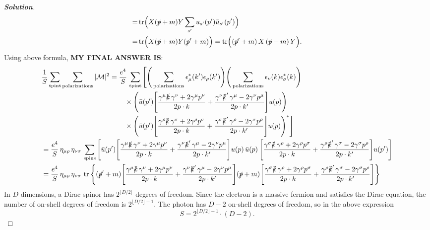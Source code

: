 \documentclass[11pt]{article}
\newenvironment{solution}[1][]{\begin{proof}[\textbf{Solution}]}{\end{proof}}
\begin{document}
\begin{solution}[14.6]
\[\begin{aligned}
	=&\operatorname{tr}\!\Big(X(\slashed p+m)Y\sum_{s'}u_{s'}(p')\bar u_{s'}(p')\Big)\\
	=&\operatorname{tr}\!\Big(X(\slashed p+m)Y(\slashed p'+m)\Big)=\operatorname{tr}\!\Big((\slashed p'+m)\,X\,(\slashed p+m)\,Y\Big).
\end{aligned}
\]
Using above formula, \textbf{MY FINAL ANSWER IS}:
\[
\begin{aligned}
	&\frac1S\sum_{\text{spins}}\sum_{\text{polarizations}}|\mathcal M|^2
	=\frac{e^4}{S}\,
	\sum_{\text{spins}}
	\Bigg[
	\Bigg(\sum_{\text{polarizations}}\epsilon_\mu^*(k')\epsilon_\rho(k')\Bigg)
	\Bigg(\sum_{\text{polarizations}}\epsilon_\nu(k)\epsilon_\sigma^*(k)\Bigg)
	\\
	&\qquad\qquad\qquad\qquad\qquad\qquad\times
	\Bigg(\bar u(p')\Bigg[
	\frac{\gamma^\mu\slashed k\,\gamma^\nu+2\gamma^\mu p^\nu}{2p\cdot k}
	+\frac{\gamma^\nu\slashed k'\,\gamma^\mu-2\gamma^\nu p^\mu}{2p\cdot k'}
	\Bigg]u(p)\Bigg)
	\\
	&\qquad\qquad\qquad\qquad\qquad\qquad\times
	\Bigg(\bar u(p')\Bigg[
	\frac{\gamma^\rho\slashed k\,\gamma^\sigma+2\gamma^\rho p^\sigma}{2p\cdot k}
	+\frac{\gamma^\sigma\slashed k'\,\gamma^\rho-2\gamma^\sigma p^\rho}{2p\cdot k'}
	\Bigg]u(p)\Bigg)^*
	\Bigg]
	\\
	&=\frac{e^4}{S}\,
	\eta_{\mu\rho}\,\eta_{\nu\sigma}\,
	\sum_{\text{spins}}
	\Bigg[
	\bar u(p')\Bigg[
	\frac{\gamma^\mu\slashed k\,\gamma^\nu+2\gamma^\mu p^\nu}{2p\cdot k}
	+\frac{\gamma^\nu\slashed k'\,\gamma^\mu-2\gamma^\nu p^\mu}{2p\cdot k'}
	\Bigg]u(p)\,
	\bar u(p)\,
	\Bigg[
	\frac{\gamma^\sigma\slashed k\,\gamma^\rho+2\gamma^\rho p^\sigma}{2p\cdot k}
	+\frac{\gamma^\rho\slashed k'\,\gamma^\sigma-2\gamma^\sigma p^\rho}{2p\cdot k'}
	\Bigg]u(p')
	\Bigg]
	\\
	&=\frac{e^4}{S}\,
	\eta_{\mu\rho}\,\eta_{\nu\sigma}\,
	\operatorname{tr}\Bigg\{
	(\slashed p'+m)\Bigg[
	\frac{\gamma^\mu\slashed k\,\gamma^\nu+2\gamma^\mu p^\nu}{2p\cdot k}
	+\frac{\gamma^\nu\slashed k'\,\gamma^\mu-2\gamma^\nu p^\mu}{2p\cdot k'}
	\Bigg]
	(\slashed p+m)\Bigg[
	\frac{\gamma^\sigma\slashed k\,\gamma^\rho+2\gamma^\rho p^\sigma}{2p\cdot k}
	+\frac{\gamma^\rho\slashed k'\,\gamma^\sigma-2\gamma^\sigma p^\rho}{2p\cdot k'}
	\Bigg]
	\Bigg\}
\end{aligned}
\]
In $D$ dimensions, a Dirac spinor has $2^{\lfloor D/2\rfloor}$ degrees of freedom. Since the electron is a massive fermion and satisfies the Dirac equation, the number of on-shell degrees of freedom is $2^{\lfloor D/2\rfloor-1}$. The photon has $D-2$ on-shell degrees of freedom, so in the above expression
\[
S=2^{\lfloor D/2\rfloor-1}\cdot(D-2).
\]

\end{solution}
\end{document}
